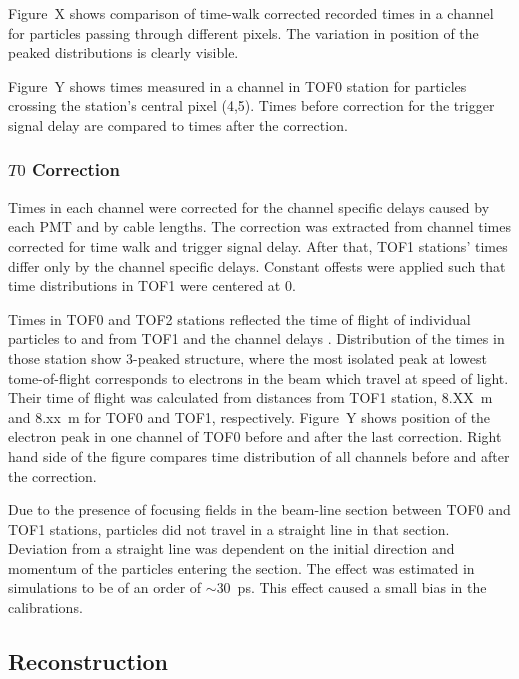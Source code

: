 Figure~X shows comparison of time-walk corrected recorded times in a
channel for particles passing through different pixels. The variation
in position of the peaked distributions is clearly visible.

Figure~Y shows times measured in a channel in TOF0 station for
particles crossing the station's central pixel (4,5). Times
before correction for the trigger signal delay are compared to times
after the correction.

\subsubsection{$T0$ Correction}

Times in each channel were corrected for the channel specific delays
caused by each PMT and by cable lengths. The correction was extracted
from channel times corrected for time walk and trigger signal
delay. After that, TOF1 stations' times differ only by the channel
specific delays. Constant offests were applied such that time distributions
in TOF1 were centered at 0.

Times in TOF0 and TOF2 stations reflected the time of flight of
individual particles to and from TOF1 and the channel delays
\Tzero. Distribution of the times in those station show 3-peaked
structure, where the most isolated peak at lowest tome-of-flight
corresponds to electrons in the beam which travel at speed of
light. Their time of flight was calculated from distances from TOF1
station, 8.XX~m and 8.xx~m for TOF0 and TOF1, respectively. Figure~Y
shows position of the electron peak in one channel of TOF0 before and
after the last correction. Right hand side of the figure compares
time distribution of all channels before and after the correction.

Due to the presence of focusing fields in the beam-line section
between TOF0 and TOF1 stations, particles did not travel in a straight
line in that section. Deviation from a straight line was dependent on
the initial direction and momentum of the particles entering the
section. The effect was estimated  in
simulations to be of an order of $\sim$30~ps. This effect caused a
small bias in the calibrations.



\subsection{Reconstruction}

